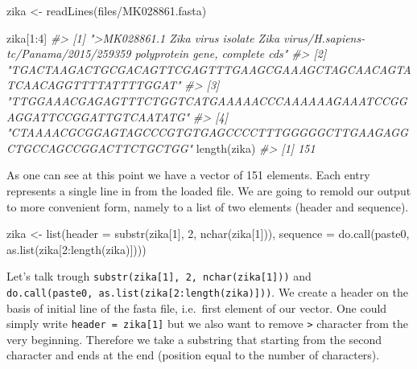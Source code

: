 \documentclass[
]{book}
\newenvironment{Shaded}{\begin{snugshade}}{\end{snugshade}}
\newcommand{\CommentTok}[1]{\textcolor[rgb]{0.56,0.35,0.01}{\textit{#1}}}
\newcommand{\DecValTok}[1]{\textcolor[rgb]{0.00,0.00,0.81}{#1}}
\newcommand{\FunctionTok}[1]{\textcolor[rgb]{0.00,0.00,0.00}{#1}}
\newcommand{\NormalTok}[1]{#1}
\newcommand{\OtherTok}[1]{\textcolor[rgb]{0.56,0.35,0.01}{#1}}
\newcommand{\SpecialCharTok}[1]{\textcolor[rgb]{0.00,0.00,0.00}{#1}}
\newcommand{\StringTok}[1]{\textcolor[rgb]{0.31,0.60,0.02}{#1}}
\begin{document}
\begin{Shaded}
\begin{Highlighting}[]
\NormalTok{zika }\OtherTok{\textless{}{-}} \FunctionTok{readLines}\NormalTok{(}\StringTok{\textquotesingle{}files/MK028861.fasta\textquotesingle{}}\NormalTok{)}

\NormalTok{zika[}\DecValTok{1}\SpecialCharTok{:}\DecValTok{4}\NormalTok{]}
\CommentTok{\#\textgreater{} [1] "\textgreater{}MK028861.1 Zika virus isolate Zika virus/H.sapiens{-}tc/Panama/2015/259359 polyprotein gene, complete cds"}
\CommentTok{\#\textgreater{} [2] "TGACTAAGACTGCGACAGTTCGAGTTTGAAGCGAAAGCTAGCAACAGTATCAACAGGTTTTATTTTGGAT"                                  }
\CommentTok{\#\textgreater{} [3] "TTGGAAACGAGAGTTTCTGGTCATGAAAAACCCAAAAAAGAAATCCGGAGGATTCCGGATTGTCAATATG"                                  }
\CommentTok{\#\textgreater{} [4] "CTAAAACGCGGAGTAGCCCGTGTGAGCCCCTTTGGGGGCTTGAAGAGGCTGCCAGCCGGACTTCTGCTGG"}
\FunctionTok{length}\NormalTok{(zika)}
\CommentTok{\#\textgreater{} [1] 151}
\end{Highlighting}
\end{Shaded}

As one can see at this point we have a vector of 151 elements. Each entry represents a single line in from the loaded file. We are going to remold our output to more convenient form, namely to a list of two elements (header and sequence).

\begin{Shaded}
\begin{Highlighting}[]
\NormalTok{zika }\OtherTok{\textless{}{-}} \FunctionTok{list}\NormalTok{(}\StringTok{\textquotesingle{}header\textquotesingle{}} \OtherTok{=} \FunctionTok{substr}\NormalTok{(zika[}\DecValTok{1}\NormalTok{], }\DecValTok{2}\NormalTok{, }\FunctionTok{nchar}\NormalTok{(zika[}\DecValTok{1}\NormalTok{])), }
             \StringTok{\textquotesingle{}sequence\textquotesingle{}} \OtherTok{=} \FunctionTok{do.call}\NormalTok{(paste0, }\FunctionTok{as.list}\NormalTok{(zika[}\DecValTok{2}\SpecialCharTok{:}\FunctionTok{length}\NormalTok{(zika)])))}
\end{Highlighting}
\end{Shaded}

Let's talk trough \texttt{substr(zika{[}1{]},\ 2,\ nchar(zika{[}1{]}))} and \texttt{do.call(paste0,\ as.list(zika{[}2:length(zika){]}))}. We create a header on the basis of initial line of the fasta file, i.e.~first element of our vector. One could simply write \texttt{\textquotesingle{}header\textquotesingle{}\ =\ zika{[}1{]}} but we also want to remove \texttt{\textgreater{}} character from the very beginning. Therefore we take a substring that starting from the second character and ends at the end (position equal to the number of characters).
\end{document}
